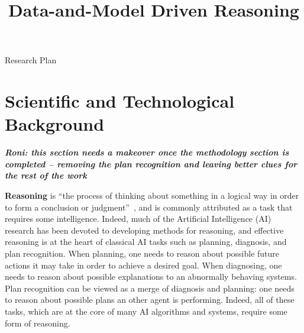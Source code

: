 \documentclass[12pt]{article}
\newcommand{\note}[1]{\textbf{\textit{#1}}}
\begin{document}
\title{Data-and-Model Driven Reasoning}

\begin{center}
\LARGE{Research Plan}
\end{center}

\section{Scientific and Technological Background}
\note{Roni: this section needs a makeover once the methodology section is completed -- removing the plan recognition and leaving better clues for the rest of the work}


{\bf Reasoning} is ``the process of thinking about something in a logical way in order to form a conclusion or judgment''~\cite{reasoning2016dictionary}, and is commonly attributed as a task that requires some intelligence. Indeed, much of the Artificial Intelligence (AI) research has been devoted to developing methods for reasoning, and effective reasoning is at the heart of classical AI tasks such as planning, diagnosis, and plan recognition. When planning, one needs to reason about possible future actions it may take in order to achieve a desired goal. When diagnosing, one needs to reason about possible explanations to an abnormally behaving systems. Plan recognition can be viewed as a merge of diagnosis and planning: one needs to reason about possible plans an other agent is performing. Indeed, all of these tasks, which are at the core of many AI algorithms and systems, require some form of reasoning.  



\end{document}
